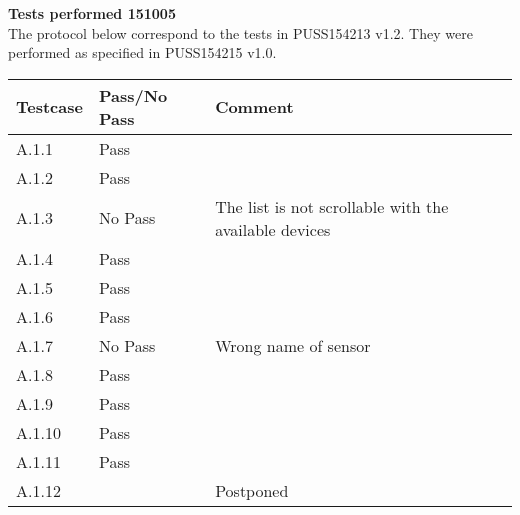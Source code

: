 \renewcommand{\testdate}{151005}
\textbf{ Tests performed \testdate} \\
The protocol below correspond to the tests in PUSS154213 v1.2. They were performed as specified in PUSS154215 v1.0.

\begin{center}
  		\begin{tabular}{| p{3cm} | p{5cm} | p{5cm} |}
    		\hline
	    	\textbf{Testcase}			& \textbf{Pass/No Pass} 	& \textbf{Comment} \\ \hline
    		A.1.1		 						& Pass 								&  \\\hline
    		A.1.2		 						& Pass 								& 				 \\	\hline
    		A.1.3		 						& No Pass 							& The list is not scrollable with the available devices		 \\	\hline
    		A.1.4		 						& Pass 								& 				 \\	\hline
    		A.1.5		 						& Pass 								& 				 \\	\hline
    		A.1.6		 						& Pass 								& 				 \\	\hline
    		A.1.7		 						& No Pass 							& Wrong name of sensor 				 \\	\hline
    		A.1.8		 						& Pass 								& 				 \\	\hline
    		A.1.9		 						& Pass 								& 				 \\	\hline
    		A.1.10	 							& Pass 								& 				 \\	\hline
    		A.1.11	 							& Pass 								& 				 \\	\hline
    		A.1.12	 							&  									& Postponed				 \\	\hline 		
 		 \end{tabular}
\end{center}
	